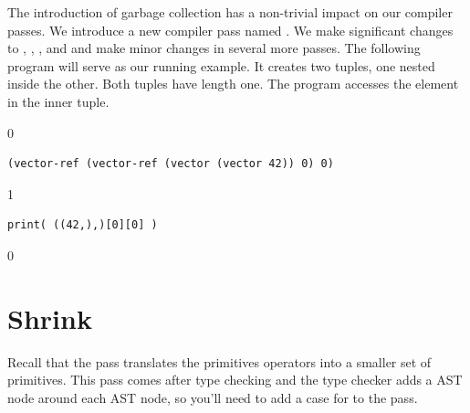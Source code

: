 \documentclass[7x10,nocrop]{TimesAPriori_MIT}%
\def\racketEd{0}
\def\pythonEd{1}
\def\edition{1}
\newtheorem{exercise}[theorem]{Exercise}
\begin{document}

The introduction of garbage collection has a non-trivial impact on our
compiler passes. We introduce a new compiler pass named
. We make significant changes to
, ,
, and  and
make minor changes in several more passes.  The following program will
serve as our running example.  It creates two tuples, one nested
inside the other. Both tuples have length one. The program accesses
the element in the inner tuple.
{\if\edition\racketEd
\begin{lstlisting}
(vector-ref (vector-ref (vector (vector 42)) 0) 0)
\end{lstlisting}
\fi}
{\if\edition\pythonEd
\begin{lstlisting}
print( ((42,),)[0][0] )
\end{lstlisting}
\fi}


{\if\edition\racketEd
\section{Shrink}
\label{sec:shrink-Lvec}

Recall that the  pass translates the primitives operators
into a smaller set of primitives.
%
This pass comes after type checking and the type checker adds a
 AST node around each  AST node, so you'll
need to add a case for  to the  pass.

\fi}
\end{document}
